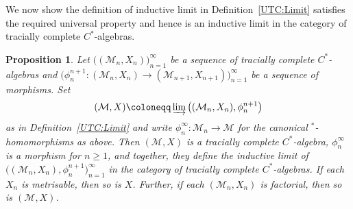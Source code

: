 \documentclass[a4paper,11pt]{amsart}
\newtheorem{proposition}[theorem]{Proposition}
\theoremstyle{definition}
\numberwithin{equation}{section}
\numberwithin{theorem}{section}
\newcommand{\M}{\mathcal{M}}
\begin{document}
We now show the definition of inductive limit in Definition~\ref{UTC:Limit} satisfies the required universal property and hence is an inductive limit in the category of tracially complete $C^*$-algebras.
\begin{proposition}
	\label{prop:UTCInductiveLimit}
	Let $\big((\M_n,X_n)\big)_{n=1}^\infty$ be a sequence of tracially complete $C^*$-algebras and $\big(\phi_n^{n+1}\colon (\M_n, X_n) \to (\M_{n+1}, X_{n+1})\big)_{n=1}^\infty$ be a sequence of morphisms. Set
	\begin{equation} (\M,X) \coloneqq \varinjlim \big((\M_n,X_n),\phi_n^{n+1}\big) \end{equation}
	as in Definition~\ref{UTC:Limit} and write $\phi_n^\infty \colon \M_n \rightarrow \M$ for the canonical $^*$-homo\-mor\-phisms as above.
	Then $(\M,X)$ is a tracially complete $C^*$-algebra, $\phi_n^\infty$ is a morphism for $n \geq 1$, and together, they define the inductive limit of $\big((\M_n,X_n),\phi_n^{n+1}\big)_{n=1}^\infty$ in the category of tracially complete $C^*$-algebras.
	If each $X_n$ is metrisable, then so is $X$.  Further, if each $(\M_n, X_n)$ is factorial, then so is $(\M, X)$.
\end{proposition}
\end{document}

